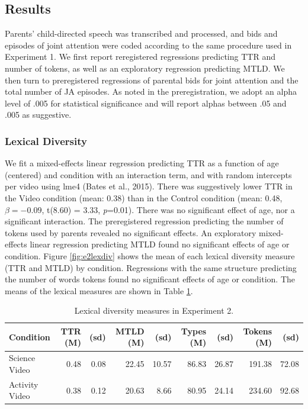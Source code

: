\documentclass[man,floatsintext]{apa6}
\begin{document}
\hypertarget{results-1}{%
\subsection{Results}\label{results-1}}

Parents' child-directed speech was transcribed and processed, and bids and episodes of joint attention were coded according to the same procedure used in Experiment 1.
We first report reregistered regressions predicting TTR and number of tokens, as well as an exploratory regression predicting MTLD.
We then turn to preregistered regressions of parental bids for joint attention and the total number of JA episodes.
As noted in the preregistration, we adopt an alpha level of .005 for statistical significance and will report alphas between .05 and .005 as suggestive.

\hypertarget{lexical-diversity-1}{%
\subsubsection{Lexical Diversity}\label{lexical-diversity-1}}

We fit a mixed-effects linear regression predicting TTR as a function of age (centered) and condition with an interaction term, and with random intercepts per video using lme4 (Bates et al., 2015).
There was suggestively lower TTR in the Video condition (mean: 0.38) than in the Control condition (mean: 0.48, \(\beta=-0.09\), t(8.60) = 3.33, \emph{p}=0.01).
There was no significant effect of age, nor a significant interaction.
The preregistered regression predicting the number of tokens used by parents revealed no significant effects.
An exploratory mixed-effects linear regression predicting MTLD found no significant effects of age or condition.
Figure \ref{fig:e2lexdiv} shows the mean of each lexical diversity measure (TTR and MTLD) by condition.
Regressions with the same structure predicting the number of words tokens found no significant effects of age or condition.
The means of the lexical measures are shown in Table \ref{e2tab}.

\begin{table}[t]

\caption{\label{tab:e2tab}\label{e2tab} Lexical diversity measures in Experiment 2.}
\centering
\begin{tabular}{l|r|r|r|r|r|r|r|r}
\hline
Condition & TTR (M) & (sd) & MTLD (M) & (sd) & Types (M) & (sd) & Tokens (M) & (sd)\\
\hline
Science Video & 0.48 & 0.08 & 22.45 & 10.57 & 86.83 & 26.87 & 191.38 & 72.08\\
\hline
Activity Video & 0.38 & 0.12 & 20.63 & 8.66 & 80.95 & 24.14 & 234.60 & 92.68\\
\hline
\end{tabular}
\end{table}
\end{document}
